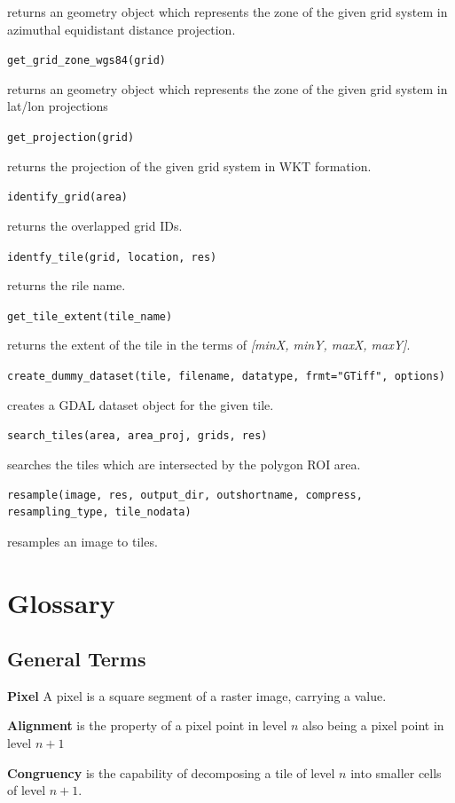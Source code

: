 \documentclass[10pt,a4paper]{article}
\begin{document}
returns an geometry object which represents the zone of the given grid system in azimuthal equidistant distance projection.

\verb#get_grid_zone_wgs84(grid)#

returns an geometry object which represents the zone of the given grid system in lat/lon projections

\verb#get_projection(grid)#

returns the projection of the given grid system in WKT formation.

\verb#identify_grid(area)#

returns the overlapped grid IDs.

\verb#identfy_tile(grid, location, res)#

returns the rile name.

\verb#get_tile_extent(tile_name)#
 
returns the extent of the tile in the terms of \textit{[minX, minY, maxX, maxY]}.

\verb#create_dummy_dataset(tile, filename, datatype, frmt="GTiff", options)#

creates a GDAL dataset object for the given tile.

\verb#search_tiles(area, area_proj, grids, res)#

searches the tiles which are intersected by the polygon ROI area.

\newpage

\begin{lstlisting}
resample(image, res, output_dir, outshortname, compress, resampling_type, tile_nodata)
\end{lstlisting}

resamples an image to tiles.


\section{Glossary}

\subsection*{General Terms}

\textbf{Pixel} A pixel is a square segment of a raster image, carrying a value.

\textbf{Alignment} is the property of a pixel point in level $n$ also being a pixel point in level $n+1$

\textbf{Congruency} is the capability of decomposing a tile of level $n$ into smaller cells of level $n+1$.
\end{document}
